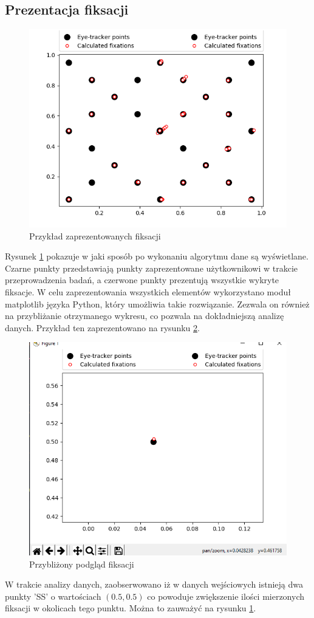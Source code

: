 \subsection{Prezentacja fiksacji}
\label{ssec:fixations}
\begin{figure}[H]
        \centering
        \captionsetup{justification=centering,margin=2cm}
        \includegraphics[width=0.8\linewidth]{resources/calculated_fixations.png}
        \caption{Przykład zaprezentowanych fiksacji}
        \label{fig:presentationfixation}
\end{figure}
Rysunek \ref{fig:presentationfixation} pokazuje w jaki sposób po wykonaniu algorytmu dane są wyświetlane. Czarne punkty przedstawiają punkty zaprezentowane użytkownikowi w trakcie przeprowadzenia badań, a czerwone punkty prezentują wszystkie wykryte fiksacje. W celu zaprezentowania wszystkich elementów wykorzystano moduł matplotlib języka Python, który umożliwia takie rozwiązanie. Zezwala on również na przybliżanie otrzymanego wykresu, co pozwala na dokładniejszą analizę danych. Przykład ten zaprezentowano na rysunku \ref{fig:zoomedfixation}.
\begin{figure}[H]
        \centering
        \captionsetup{justification=centering,margin=2cm}
        \includegraphics[width=0.8\linewidth]{resources/zoomed_fixation.png}
        \caption{Przybliżony podgląd fiksacji}
        \label{fig:zoomedfixation}
\end{figure}
W trakcie analizy danych, zaobserwowano iż w danych wejściowych istnieją dwa punkty 'SS' o wartościach $(0.5,0.5)$ co powoduje zwiększenie ilości mierzonych fiksacji w okolicach tego punktu. Można to zauważyć na rysunku \ref{fig:presentationfixation}.
